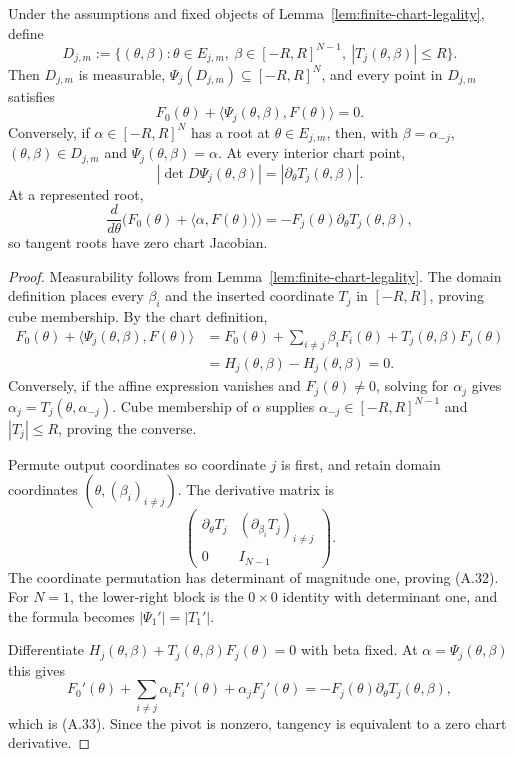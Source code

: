 \begin{lemma}
\label{lem:affine-chart-jacobian}
Under the assumptions and fixed objects of
Lemma~\ref{lem:finite-chart-legality}, define
\[
D_{j,m}:=\{(\theta,\beta):\theta\in E_{j,m},
 \ \beta\in[-R,R]^{N-1},\ |T_j(\theta,\beta)|\leq R\}.
\]
Then $D_{j,m}$ is measurable,
$\Psi_j(D_{j,m})\subseteq[-R,R]^N$, and every point in $D_{j,m}$ satisfies
\[
F_0(\theta)+\langle\Psi_j(\theta,\beta),F(\theta)\rangle=0.
\tag{A.31}
\]
Conversely, if $\alpha\in[-R,R]^N$ has a root at
$\theta\in E_{j,m}$, then, with $\beta=\alpha_{-j}$,
$(\theta,\beta)\in D_{j,m}$ and $\Psi_j(\theta,\beta)=\alpha$.  At every
interior chart point,
\[
|\det D\Psi_j(\theta,\beta)|
=|\partial_\theta T_j(\theta,\beta)|.
\tag{A.32}
\]
At a represented root,
\[
\frac d{d\theta}
\bigl(F_0(\theta)+\langle\alpha,F(\theta)\rangle\bigr)
=-F_j(\theta)\partial_\theta T_j(\theta,\beta),
\tag{A.33}
\]
so tangent roots have zero chart Jacobian.
\end{lemma}

\begin{proof}
Measurability follows from Lemma~\ref{lem:finite-chart-legality}.  The domain
definition places every $\beta_i$ and the inserted coordinate $T_j$ in
$[-R,R]$, proving cube membership.  By the chart definition,
\[
\begin{aligned}
F_0(\theta)+\langle\Psi_j(\theta,\beta),F(\theta)\rangle
&=F_0(\theta)+\sum_{i\neq j}\beta_iF_i(\theta)
 +T_j(\theta,\beta)F_j(\theta)\\
&=H_j(\theta,\beta)-H_j(\theta,\beta)=0.
\end{aligned}
\]
Conversely, if the affine expression vanishes and $F_j(\theta)\neq0$, solving
for $\alpha_j$ gives $\alpha_j=T_j(\theta,\alpha_{-j})$.  Cube membership of
$\alpha$ supplies $\alpha_{-j}\in[-R,R]^{N-1}$ and $|T_j|\leq R$, proving
the converse.

Permute output coordinates so coordinate $j$ is first, and retain domain
coordinates $(\theta,(\beta_i)_{i\neq j})$.  The derivative matrix is
\[
\begin{pmatrix}
\partial_\theta T_j&(\partial_{\beta_i}T_j)_{i\neq j}\\
0&I_{N-1}
\end{pmatrix}.
\]
The coordinate permutation has determinant of magnitude one, proving (A.32).
For $N=1$, the lower-right block is the $0\times0$ identity with determinant
one, and the formula becomes $|\Psi_1'|=|T_1'|$.

Differentiate
$H_j(\theta,\beta)+T_j(\theta,\beta)F_j(\theta)=0$ with beta fixed.  At
$\alpha=\Psi_j(\theta,\beta)$ this gives
\[
F_0'(\theta)+\sum_{i\neq j}\alpha_iF_i'(\theta)
 +\alpha_jF_j'(\theta)
=-F_j(\theta)\partial_\theta T_j(\theta,\beta),
\]
which is (A.33).  Since the pivot is nonzero, tangency is equivalent to a
zero chart derivative.
\end{proof}

